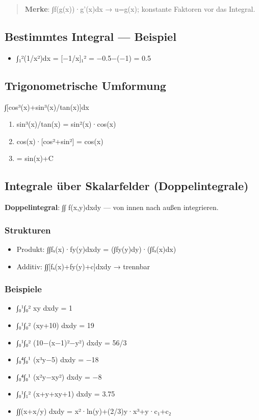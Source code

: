 \documentclass[11pt, a4paper]{article}
\begin{document}
\begin{quote}
\textbf{Merke}: ∫f(g(x))·g'(x)dx → u=g(x); konstante Faktoren vor das Integral.
\end{quote}


\subsection{Bestimmtes Integral — Beispiel}
\begin{itemize}
  \item ∫₁²(1/x²)dx = [−1/x]₁² = −0.5−(−1) = 0.5
\end{itemize}


\subsection{Trigonometrische Umformung}
∫[cos³(x)+sin³(x)/tan(x)]dx

\begin{enumerate}
  \item sin³(x)/tan(x) = sin²(x)·cos(x)
  \item cos(x)·[cos²+sin²] = cos(x)
  \item = sin(x)+C
\end{enumerate}


\subsection{Integrale über Skalarfelder (Doppelintegrale)}
\textbf{Doppelintegral}: ∫∫ f(x,y)dxdy — von innen nach außen integrieren.



\subsubsection{Strukturen}
\begin{itemize}
  \item Produkt: ∫∫fₓ(x)·fy(y)dxdy = (∫fy(y)dy)·(∫fₓ(x)dx)
  \item Additiv: ∫∫[fₓ(x)+fy(y)+c]dxdy → trennbar
\end{itemize}


\subsubsection{Beispiele}
\begin{itemize}
  \item ∫₀¹∫₀² xy dxdy = 1
  \item ∫₀¹∫₀² (xy+10) dxdy = 19
  \item ∫₀¹∫₀² (10−(x−1)²−y²) dxdy = 56/3
  \item ∫₀⁴∫₀¹ (x³y−5) dxdy = −18
  \item ∫₀⁴∫₀¹ (x²y−xy²) dxdy = −8
  \item ∫₀¹∫₁² (x+y+xy+1) dxdy = 3.75
  \item ∫∫(x+x/y) dxdy = x²·ln(y)+(2/3)y·x³+y·c₁+c₂
\end{itemize}
\end{document}
